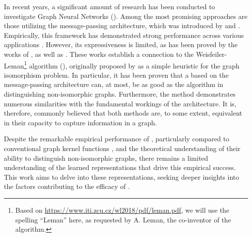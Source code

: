 In recent years, a significant amount of research has been conducted to investigate \textsf{Graph Neural Networks} (\gnns). Among the most promising approaches are those utilizing the message-passing architecture, which was introduced by \cite{Sca+2009} and \cite{Gil+2017}. 
Empirically, this framework has demonstrated strong performance across various applications \cite{Kip+2017, Ham+2017, Xu2018}. However, its expressiveness is limited, as has been proved by the works of \cite{Morris2018}, as well as \cite{Xu2018}. These works establish a connection to the \textsf{Weisfeiler-Leman}\footnote{Based on \href{https://www.iti.zcu.cz/wl2018/pdf/leman.pdf}{https://www.iti.zcu.cz/wl2018/pdf/leman.pdf}, we will use the spelling ``Leman'' here, as requested by A. Leman, the co-inventor of the algorithm.} algorithm (\wl), originally proposed by \cite{Wei+1968} as a simple heuristic for the graph isomorphism problem. In particular, it has been proven that a \gnn based on the message-passing architecture can, at most, be as good as the \wl algorithm in distinguishing non-isomorphic graphs. Furthermore, the \wl method demonstrates numerous similarities with the fundamental workings of the \gnn architecture. It is, therefore, commonly believed that both methods are, to some extent, equivalent in their capacity to capture information in a graph.

Despite the remarkable empirical performance of \gnns, particularly compared to conventional graph kernel functions \cite{Mor+2020}, and the theoretical understanding of their ability to distinguish non-isomorphic graphs, there remains a limited understanding of the learned representations that drive this empirical success. This work aims to delve into these representations, seeking deeper insights into the factors contributing to the efficacy of \gnns.

